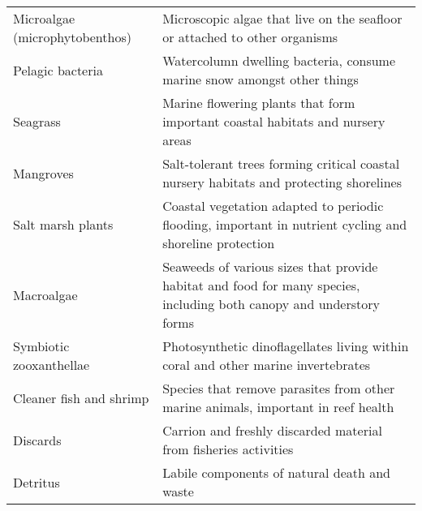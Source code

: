 \begin{longtable}{p{}p{}}
Microalgae (microphytobenthos) & Microscopic algae that live on the seafloor or attached to other organisms \\
Pelagic bacteria & Watercolumn dwelling bacteria, consume marine snow amongst other things \\
Seagrass & Marine flowering plants that form important coastal habitats and nursery areas \\
Mangroves & Salt-tolerant trees forming critical coastal nursery habitats and protecting shorelines \\
Salt marsh plants & Coastal vegetation adapted to periodic flooding, important in nutrient cycling and shoreline protection \\
Macroalgae & Seaweeds of various sizes that provide habitat and food for many species, including both canopy and understory forms \\
Symbiotic zooxanthellae & Photosynthetic dinoflagellates living within coral and other marine invertebrates \\
Cleaner fish and shrimp & Species that remove parasites from other marine animals, important in reef health \\
Discards & Carrion and freshly discarded material from fisheries activities \\
Detritus & Labile components of natural death and waste \\
\end{longtable}
